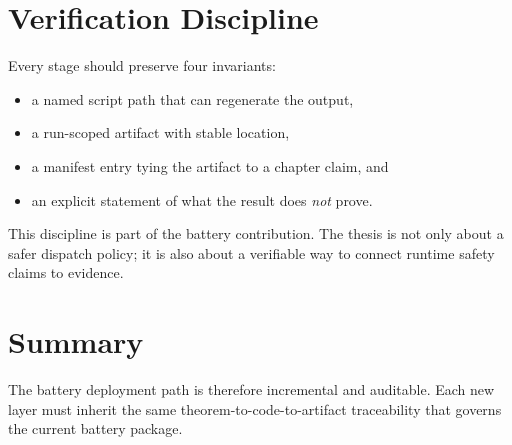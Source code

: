 \section{Verification Discipline}

Every stage should preserve four invariants:

\begin{itemize}
  \item a named script path that can regenerate the output,
  \item a run-scoped artifact with stable location,
  \item a manifest entry tying the artifact to a chapter claim, and
  \item an explicit statement of what the result does \emph{not} prove.
\end{itemize}

This discipline is part of the battery contribution.  The thesis is not only
about a safer dispatch policy; it is also about a verifiable way to connect
runtime safety claims to evidence.

\section{Summary}

The battery deployment path is therefore incremental and auditable.  Each new
layer must inherit the same theorem-to-code-to-artifact traceability that
governs the current battery package.
